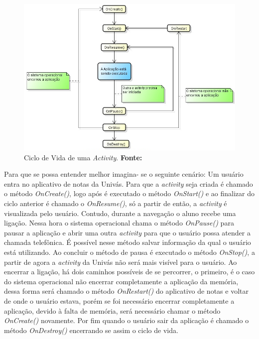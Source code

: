 \begin{figure}[h!]
	\centerline{\includegraphics[scale=0.5]{./imagens/1_q_teorico/qt1.png}}
	\caption[Ciclo de Vida de uma \textit{Activity} ]{Ciclo de Vida de uma
	\textit{Activity}.
	 \textbf{Fonte:}}
	\label{fig:qt1}
\end{figure}

	\par Para que se possa entender melhor imagina- se o
seguinte cenário: Um usuário entra no aplicativo de notas da Univás. Para que a
\textit{activity} seja criada é chamado o método \textit{OnCreate()}, logo após
é executado o método \textit{OnStart()} e ao finalizar do ciclo anterior é
chamado o \textit{OnResume()}, só a partir de então, a \textit{activity} é
visualizada pelo usuário. Contudo, durante a navegação o aluno recebe uma
ligação. Nessa hora o sistema operacional chama o método \textit{OnPause()}
para pausar a aplicação e abrir uma outra \textit{activity} para que o usuário
possa atender a chamada telefônica. É possível nesse método salvar informação
da qual o usuário está utilizando. Ao concluir o método de pausa é executado o
método \textit{OnStop()}, a partir de agora a \textit{activity} da Univás não
será mais visível para o usuário. Ao encerrar a ligação, há dois caminhos
possíveis de se percorrer, o primeiro, é o caso do sistema operacional não
encerrar completamente a aplicação da memória, dessa forma será chamado o
método \textit{OnRestart()} do aplicativo de notas e voltar de onde o usuário
estava, porém se foi necessário encerrar completamente a aplicação, devido à
falta de memória, será necessário chamar o método \textit{OnCreate()}
novamente. Por fim quando o usuário sair da aplicação é chamado o método
\textit{OnDestroy()} encerrando se assim o ciclo de vida.

